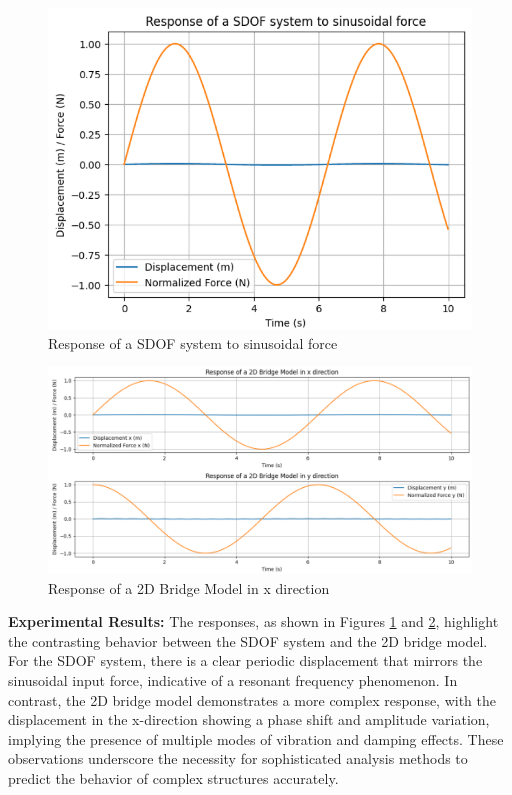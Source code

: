 \documentclass[conference]{IEEEtran}
\begin{document}
\begin{figure}[ht]
\centering
\includegraphics[width=\linewidth]{9.png}
\caption{Response of a SDOF system to sinusoidal force}
\label{fig:singleDOFResponse}
\end{figure}

\begin{figure}[ht]
\centering
\includegraphics[width=\linewidth]{10.png}
\caption{Response of a 2D Bridge Model in x direction}
\label{fig:2DBridgeModelResponse}
\end{figure}

\textbf{Experimental Results:} The responses, as shown in Figures \ref{fig:singleDOFResponse} and \ref{fig:2DBridgeModelResponse}, highlight the contrasting behavior between the SDOF system and the 2D bridge model. For the SDOF system, there is a clear periodic displacement that mirrors the sinusoidal input force, indicative of a resonant frequency phenomenon. In contrast, the 2D bridge model demonstrates a more complex response, with the displacement in the x-direction showing a phase shift and amplitude variation, implying the presence of multiple modes of vibration and damping effects. These observations underscore the necessity for sophisticated analysis methods to predict the behavior of complex structures accurately.
\end{document}
